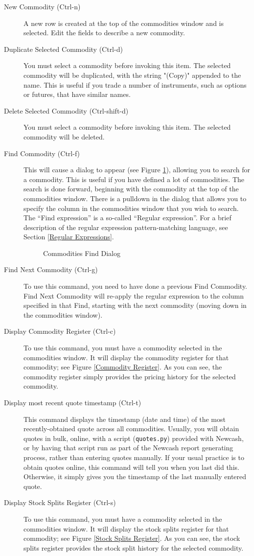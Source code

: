 \documentclass{report}
\newcommand{\graphicsfig}[5]{
\begin{figure}[#5]
\begin{center}
\resizebox{#1}{!}{\texttt{[image: \#2]}}
\end{center}
\caption{#3}
\label{#4}
\end{figure}
}
\begin{document}
\begin{description}
\item [New Commodity (Ctrl-n)]  A new row is created at the top of the commodities window and is selected. Edit the fields to describe a new commodity.
\item [Duplicate Selected Commodity (Ctrl-d)]  You must select a commodity before invoking this item. The selected commodity will be duplicated, with the string "(Copy)" appended to the name. This is useful if you trade a number of instruments, such as options or futures, that have similar names.
\item [Delete Selected Commodity (Ctrl-shift-d)]  You must select a commodity before invoking this item. The selected commodity will be deleted.
\item [Find Commodity (Ctrl-f)]  This will cause a dialog to appear (see Figure \ref{Commodities Find Dialog}), allowing you to search for a commodity. This is useful if you have defined a lot of commodities. The search is done forward, beginning with the commodity at the top of the commodities window. There is a pulldown in the dialog that allows you to specify the column in the commodities window that you wish to search. The ``Find expression'' is a so-called ``Regular expression''. For a brief description of the regular expression pattern-matching language, see Section \ref{Regular Expressions}.
\graphicsfig{5in}{figures/find_dialog.png}{Commodities Find Dialog}{Commodities Find Dialog}{}
\item [Find Next Commodity (Ctrl-g)]  To use this command, you need to have done a previous Find Commodity. Find Next Commodity will re-apply the regular expression to the column specified in that Find, starting with the next commodity (moving down in the commodities window).
\item [Display Commodity Register (Ctrl-c)]  To use this command, you must have a commodity selected in the commodities window. It will display the commodity register for that commodity; see Figure \ref{Commodity Register}. As you can see, the commodity register simply provides the pricing history for the selected commodity. 
\item [Display most recent quote timestamp (Ctrl-t)]  This command displays the timestamp (date and time) of the most recently-obtained quote across all commodities. Usually, you will obtain quotes in bulk, online, with a script (\verb$quotes.py$) provided with Newcash, or by having that script run as part of the Newcash report generating process, rather than entering quotes manually. If your usual practice is to obtain quotes online, this command will tell you when you last did this. Otherwise, it simply gives you the timestamp of the last manually entered quote.
\item [Display Stock Splits Register (Ctrl-s)]  To use this command, you must have a commodity selected in the commodities window. It will display the stock splits register for that commodity; see Figure \ref{Stock Splits Register}. As you can see, the stock splits register provides the stock split history for the selected commodity. 
\end{description}
\end{document}
